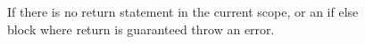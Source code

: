  \begin{figure}[H]
\centering
{}
\caption{If there is no return statement in the current scope, or an if else block where return is guaranteed throw an error.}
\label{lf05}
\end{figure}


